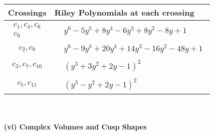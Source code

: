 \documentclass[1p]{elsarticle_modified}
\theoremstyle{definition}
\begin{document}
\begin{tabular}{m{50pt}|m{274pt}}
Crossings & \hspace{64pt}Riley Polynomials at each crossing \\
\hline $$\begin{aligned}c_{1},c_{4},c_{6}\\c_{9}\end{aligned}$$&$\begin{aligned}
&y^6-5 y^5+8 y^4-6 y^3+8 y^2-8 y+1
\end{aligned}$\\
\hline $$\begin{aligned}c_{2},c_{8}\end{aligned}$$&$\begin{aligned}
&y^6-9 y^5+20 y^4+14 y^3-16 y^2-48 y+1
\end{aligned}$\\
\hline $$\begin{aligned}c_{3},c_{7},c_{10}\end{aligned}$$&$\begin{aligned}
&(y^3+3 y^2+2 y-1)^2
\end{aligned}$\\
\hline $$\begin{aligned}c_{5},c_{11}\end{aligned}$$&$\begin{aligned}
&(y^3- y^2+2 y-1)^2
\end{aligned}$\\
\hline
\end{tabular}\\~\\
\newpage\flushleft \textbf{(vi) Complex Volumes and Cusp Shapes}
\end{document}
